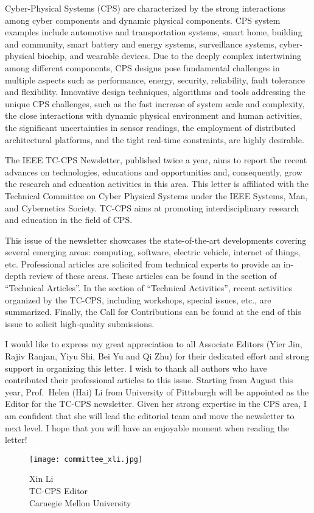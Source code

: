 
Cyber-Physical Systems (CPS) are characterized by the strong interactions among cyber components and dynamic physical components. CPS system examples include automotive and transportation systems, smart home, building and community, smart battery and energy systems, surveillance systems, cyber-physical biochip, and wearable devices. Due to the deeply complex intertwining among different components, CPS designs pose fundamental challenges in multiple aspects such as performance, energy, security, reliability, fault tolerance and flexibility. Innovative design techniques, algorithms and tools addressing the unique CPS challenges, such as the fast increase of system scale and complexity, the close interactions with dynamic physical environment and human activities, the significant uncertainties in sensor readings, the employment of distributed architectural platforms, and the tight real-time constraints, are highly desirable.

The IEEE TC-CPS Newsletter, published twice a year, aims to report the recent advances on technologies, educations and opportunities and, consequently, grow the research and education activities in this area. This letter is affiliated with the Technical Committee on Cyber Physical Systems under the IEEE Systems, Man, and Cybernetics Society. TC-CPS aims at promoting interdisciplinary research and education in the field of CPS.

This issue of the newsletter showcases the state-of-the-art developments covering several emerging areas: computing, software, electric vehicle, internet of things, etc. Professional articles are solicited from technical experts to provide an in-depth review of these areas. These articles can be found in the section of ``Technical Articles''. In the section of ``Technical Activities'', recent activities organized by the TC-CPS, including workshops, special issues, etc., are summarized. Finally, the Call for Contributions can be found at the end of this issue to solicit high-quality submissions.

I would like to express my great appreciation to all Associate Editors (Yier Jin, Rajiv Ranjan, Yiyu Shi, Bei Yu and Qi Zhu) for their dedicated effort and strong support in organizing this letter. I wish to thank all authors who have contributed their professional articles to this issue. Starting from August this year, Prof.~Helen (Hai) Li from University of Pittsburgh will be appointed as the Editor for the TC-CPS newsletter. Given her strong expertise in the CPS area, I am confident that she will lead the editorial team and move the newsletter to next level. I hope that you will have an enjoyable moment when reading the letter!


\vspace{.2in}
\begin{figure}[h]
\begin{minipage}{.3\textwidth}
\texttt{[image: committee\_xli.jpg]}
\caption*{Xin Li \\ TC-CPS Editor \\ Carnegie Mellon University}
\end{minipage}
\end{figure}

